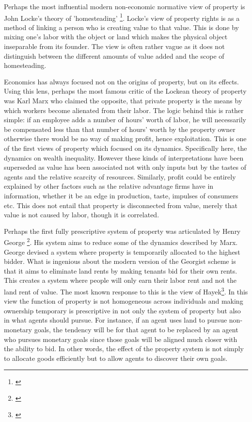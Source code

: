 Perhaps the most influential modern non-economic normative view of property is John Locke's theory of 'homesteading' \footnote{\cite{locke2014second}}. Locke's view of property rights is as a method of linking a person who is creating value to that value. This is done by mixing one's labor with the object or land which makes the physical object inseparable from its founder. The view is often rather vague as it does not distinguish between the different amounts of value added and the scope of homesteading. 

Economics has always focused not on the origins of property, but on its effects. Using this lens, perhaps the most famous critic of the Lockean theory of property was Karl Marx who claimed the opposite, that private property is the means by which workers become alienated from their labor. The logic behind this is rather simple: if an employee adds a number of hours’ worth of labor, he will necessarily be compensated less than that number of hours’ worth by the property owner otherwise there would be no way of making profit, hence exploitation. This is one of the first views of property which focused on its dynamics. Specifically here, the dynamics on wealth inequality. However these kinds of interpretations have been superseded as value has been associated not with only inputs but by the tastes of agents and the relative scarcity of resources. Similarly, profit could be entirely explained by other factors such as the relative advantage firms have in information, whether it be an edge in production, taste, impulses of consumers etc. This does not entail that property is disconnected from value, merely that value is not caused by labor, though it is correlated.

Perhaps the first fully prescriptive system of property was articulated by Henry George \footnote{\cite{progress}}. His system aims to reduce some of the dynamics described by Marx. George devised a system where property is temporarily allocated to the highest bidder. What is ingenious about the modern version of the Georgist scheme is that it aims to eliminate land rents by making tenants bid for their own rents. This creates a system where people will only earn their labor rent and not the land rent of value. The most known response to this is the view of Hayek\footnote{\cite{Fatal}}. In this view the function of property is not homogeneous across individuals and making ownership temporary is prescriptive in not only the system of property but also in what agents should pursue. For instance, if an agent uses land to pursue non-monetary goals, the tendency will be for that agent to be replaced by an agent who pursues monetary goals since those goals will be aligned much closer with the ability to bid. In other words, the effect of the property system is not simply to allocate goods efficiently but to allow agents to discover their own goals. 

